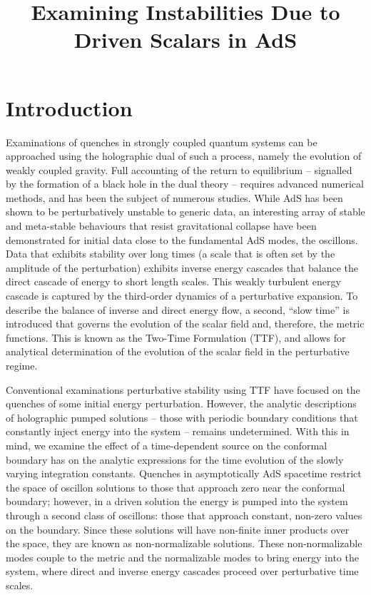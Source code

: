 \documentclass[letterpaper,11pt]{article}
\title{Examining Instabilities Due to Driven Scalars in AdS}
\begin{document}
\maketitle
\flushbottom
\newpage


\section{Introduction}

Examinations of quenches in strongly coupled quantum systems can be approached using the holographic dual of such a process, namely the evolution of weakly coupled gravity. Full accounting of the return to equilibrium -- signalled by the formation of a black hole in the dual theory -- requires advanced numerical methods, and has been the subject of numerous studies. While AdS has been shown to be perturbatively unstable to generic data, an interesting array of stable and meta-stable behaviours that resist gravitational collapse have been demonstrated for initial data close to the fundamental AdS modes, the oscillons. Data that exhibits stability over long times (a scale that is often set by the amplitude of the perturbation) exhibits inverse energy cascades that balance the direct cascade of energy to short length scales. This weakly turbulent energy cascade is captured by the third-order dynamics of a perturbative expansion. To describe the balance of inverse and direct energy flow, a second, ``slow time'' is introduced that governs the evolution of the scalar field and, therefore, the metric functions. This is known as the Two-Time Formulation (TTF), and allows for analytical determination of the evolution of the scalar field in the perturbative regime.

Conventional examinations perturbative stability using TTF have focused on the quenches of some initial energy perturbation. However, the analytic descriptions of holographic pumped solutions -- those with periodic boundary conditions that constantly inject energy into the system -- remains undetermined.  With this in mind, we examine the effect of a time-dependent source on the conformal boundary has on the analytic expressions for the time evolution of the slowly varying integration constants. Quenches in asymptotically AdS spacetime restrict the space of oscillon solutions to those that approach zero near the conformal boundary; however, in a driven solution the energy is pumped into the system through a second class of oscillons: those that approach constant, non-zero values on the boundary. Since these solutions will have non-finite inner products over the space, they are known as non-normalizable solutions. These non-normalizable modes couple to the metric and the normalizable modes to bring energy into the system, where direct and inverse energy cascades proceed over perturbative time scales.
\end{document}
